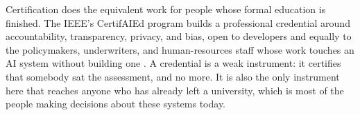 Certification does the equivalent work for people whose formal education is finished. The IEEE's CertifAIEd program builds a professional credential around accountability, transparency, privacy, and bias, open to developers and equally to the policymakers, underwriters, and human-resources staff whose work touches an AI system without building one \autocite{ieeesa2020certifaied}. A credential is a weak instrument: it certifies that somebody sat the assessment, and no more. It is also the only instrument here that reaches anyone who has already left a university, which is most of the people making decisions about these systems today.

